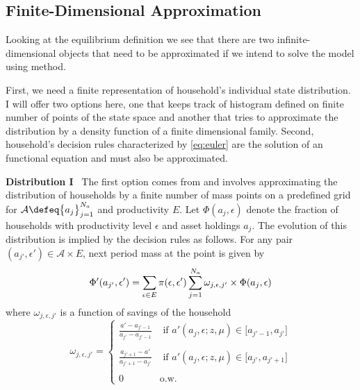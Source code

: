 \documentclass[a4paper,10pt]{article}  %
\begin{document}
\subsection{Finite-Dimensional Approximation} %
\label{sub:finite_dimensional_approximation}
Looking at the equilibrium definition we see that there are two infinite-dimensional objects that need
to be approximated if we intend to solve the model using \citet{reiter} method.

First, we need a finite representation of household's individual state distribution. I will offer two
options here, one that keeps track of histogram defined on finite number of points of the state space and
another that tries to approximate the distribution by a density function of a finite dimensional family.
Second, household's decision rules characterized by \eqref{eq:euler} are the solution of an functional equation and
must also be approximated.

\textbf{Distribution I} \
The first option comes from \citet{reiter} and involves approximating the distribution of households by a
finite number of mass points on a predefined grid for $ \mathcal{A} \defeq \big\{ a_j \big\}_{j=1}^{N_a} $ and productivity $E$.
Let $ \Phi( a_j, \epsilon ) $ denote the fraction of households with productivity level $ \epsilon $ and
asset holdings $ a_j $. The evolution of this distribution is implied by the decision rules as follows.
For any pair $ ( a_{j'}, \epsilon' ) \in \mathcal{A}\times E $, next period mass at the point is given by
\begin{equation}
   \Phi' ( a_{j'}, \epsilon' ) = \sum_{ \epsilon \in E } \pi( \epsilon, \epsilon' )
   \sum_{ j=1 }^{N_a}
   \omega_{j,\epsilon, j'}
   \times  \Phi(a_j, \epsilon) \\
\end{equation}
where $\omega_{j,\epsilon, j'}$ is a function of savings of the household
\begin{equation*}
   \label{eq:weight}
   \omega_{j,\epsilon, j'} = \begin{cases}
   \frac{ a' - a_{j'-1} }{ a_{j'} - a_{j'-1} } & \text{ if }
   a'( a_j, \epsilon ; z, \mu ) \in \Big[ a_{j'-1}, a_{j'} \Big] \\ \ & \ \\
   \frac{ a_{j'+1} - a' }{ a_{j'+1} - a_{j'} } & \text{ if }
   a'( a_j, \epsilon ; z , \mu) \in \Big[ a_{j'}, a_{j'+1} \Big] \\ \ & \ \\
   0 & \text{o.w.}
   \end{cases}
\end{equation*}
\end{document}
